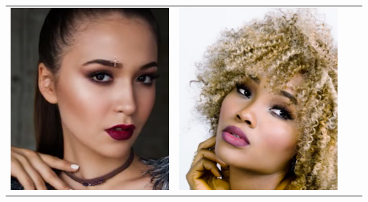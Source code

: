 \begin{table}[H]
\begin{tabular}{|N||c|c|c|}
\begin{minipage}{.29\textwidth}
    \includegraphics[width=\textwidth,height=\textheight,keepaspectratio]{images/match_other_2_targ}
  \end{minipage} & 
  \begin{minipage}{.29\textwidth}
    \includegraphics[width=\textwidth,height=\textheight,keepaspectratio]{images/match_other_2_res}

\end{minipage}
\end{tabular}
\end{table}
